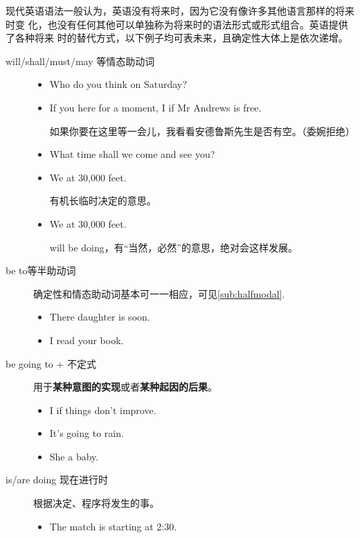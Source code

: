 现代英语语法一般认为，英语没有将来时，因为它没有像许多其他语言那样的将来时变
化，也没有任何其他可以单独称为将来时的语法形式或形式组合。英语提供了各种将来
时的替代方式，以下例子均可表未来，且确定性大体上是依次递增。
\begin{description}
\item[will/shall/must/may 等情态助动词]
  \begin{itemize}
  \item Who do you think  on Saturday?

  \item If you here for a moment, I if Mr
    Andrews is free.

    如果你要在这里等一会儿，我看看安德鲁斯先生是否有空。（委婉拒绝）
  \item What time shall we come and see you?

  \item We at 30,000 feet.

    有机长临时决定的意思。

  \item We at 30,000 feet.

    will be doing，有“当然，必然”的意思，绝对会这样发展。
  \end{itemize}
\item[be to等半助动词] 确定性和情态助动词基本可一一相应，可见\cref{sub:halfmodal}.
  \begin{itemize}
  \item There daughter is  soon.

  \item I read your book.
  \end{itemize}

\item[be going to + 不定式] 用于\textbf{某种意图的实现}或者\textbf{某种起因的后果}。
  \begin{itemize}
  \item I  if things don't improve.
  \item It's going to rain.

  \item She a baby.
  \end{itemize}

\item[is/are doing 现在进行时] 根据决定、程序将发生的事。
  \begin{itemize}
  \item The match is starting at 2:30.


\end{itemize}
\end{description}

